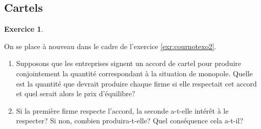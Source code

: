\documentclass[
]{book}
\providecommand{\tightlist}{%
  \setlength{\itemsep}{0pt}\setlength{\parskip}{0pt}}
\theoremstyle{definition}
\theoremstyle{definition}
\theoremstyle{definition}
\newtheorem{exercise}{Exercice}[chapter]
\theoremstyle{definition}
\theoremstyle{remark}
\begin{document}
\hypertarget{cartels}{%
\subsection{Cartels}\label{cartels}}

\begin{exercise}
\protect\hypertarget{exr:cartelexo1}{}\label{exr:cartelexo1}

On se place à nouveau dans le cadre de l'exercice \ref{exr:cournotexo2}.

\begin{enumerate}
\def\labelenumi{\arabic{enumi}.}
\tightlist
\item
  Supposons que les entreprises signent un accord de cartel pour produire conjointement la quantité correspondant à la situation de monopole.
  Quelle est la quantité que devrait produire chaque firme si elle respectait cet accord et quel serait alors le prix d'équilibre?
\item
  Si la première firme respecte l'accord, la seconde a-t-elle intérêt à le respecter? Si non, combien produira-t-elle? Quel conséquence cela a-t-il?
\end{enumerate}

\end{exercise}
\end{document}
